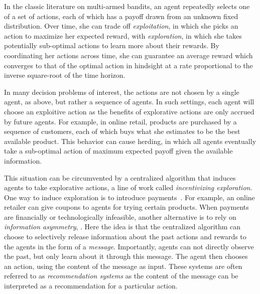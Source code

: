 


In the classic literature on multi-armed bandits, an agent repeatedly selects one of a set of actions, each of which has a payoff drawn from an unknown fixed distribution.  Over time, she can trade off {\em exploitation}, in which she picks an action to maximize her expected reward, with {\em exploration}, in which she takes potentially sub-optimal actions to learn more about their rewards.  By coordinating her actions across time, she can guarantee an average reward which converges to that of the optimal action in hindsight at a rate proportional to the inverse square-root of the time horizon.

In many decision problems of interest, the actions are not chosen by a single agent, as above, but rather a sequence of agents.  In such settings, each agent will choose an exploitive action as the benefits of explorative actions are only accrued by future agents.  For example, in online retail, products are purchased by a sequence of customers, each of which buys what she estimates to be the best available product.  This behavior can cause herding, in which all agents eventually take a sub-optimal action of maximum expected payoff given the available information.

This situation can be circumvented by a centralized algorithm that induces agents to take explorative actions, a line of work called {\em incentivizing exploration}.  One way to induce exploration is to introduce payments~\cite{Frazier-ec14,Kempe-colt18}. For example, an online retailer can give coupons to agents for trying certain products.  When payments are financially or technologically infeasible, another alternative is to rely on {\em information asymmetry}, \eg \cite{Kremer-JPE14,Che-13,ICexploration-ec15,Bimpikis-exploration-ms17}.
Here the idea is that the centralized algorithm can choose to selectively release information about the past actions and rewards to the agents in the form of a {\em message}.  Importantly, agents can not directly observe the past, but only learn about it through this message.  The agent then chooses an action, using the content of the message as input.  These systems are often referred to as {\em recommendation systems} as the content of the message can be interpreted as a recommendation for a particular action.


